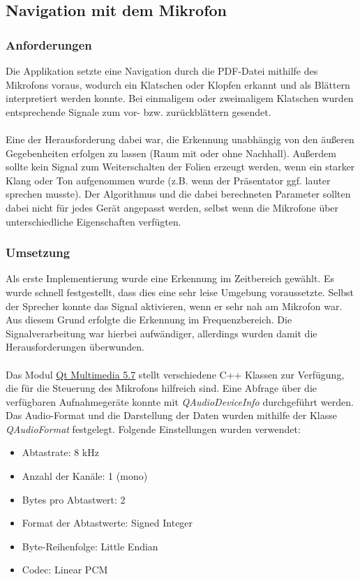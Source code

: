\subsection{Navigation mit dem Mikrofon}
\thispagestyle{fancy}

\subsubsection{Anforderungen}
Die Applikation setzte eine Navigation durch die PDF-Datei mithilfe des Mikrofons voraus, wodurch ein Klatschen oder Klopfen erkannt und als Blättern interpretiert werden konnte. Bei einmaligem oder zweimaligem Klatschen wurden entsprechende Signale zum vor- bzw. zurückblättern gesendet. \\
\\
Eine der Herausforderung dabei war, die Erkennung unabhängig von den äußeren Gegebenheiten erfolgen zu lassen (Raum mit oder ohne Nachhall). Außerdem sollte kein Signal zum Weiterschalten der Folien erzeugt werden, wenn ein starker Klang oder Ton aufgenommen wurde (z.B. wenn der Präsentator ggf. lauter sprechen musste). Der Algorithmus und die dabei berechneten Parameter sollten dabei nicht für jedes Gerät angepasst werden, selbst wenn die Mikrofone über unterschiedliche Eigenschaften verfügten. 

\subsubsection{Umsetzung}
Als erste Implementierung wurde eine Erkennung im Zeitbereich gewählt. Es wurde schnell festgestellt, dass dies eine sehr leise Umgebung voraussetzte. Selbst der Sprecher konnte das Signal aktivieren, wenn er sehr nah am Mikrofon war. Aus diesem Grund erfolgte die Erkennung im Frequenzbereich. Die Signalverarbeitung war hierbei aufwändiger, allerdings wurden damit die Herausforderungen überwunden.\\
\\
Das Modul  \href{http://doc.qt.io/qt-5/qtmultimedia-index.html}{Qt Multimedia 5.7} stellt verschiedene C++ Klassen zur Verfügung, die für die Steuerung des Mikrofons hilfreich sind. Eine Abfrage über die verfügbaren Aufnahmegeräte konnte mit \textit{QAudioDeviceInfo} durchgeführt werden. Das Audio-Format und die Darstellung der Daten wurden mithilfe der Klasse \textit{QAudioFormat} festgelegt. Folgende Einstellungen wurden verwendet:

\begin{center}
	\begin{itemize}
		\item Abtastrate: 8 kHz
		\item Anzahl der Kanäle: 1 (mono)
		\item Bytes pro Abtastwert: 2
		\item Format der Abtastwerte: Signed Integer
		\item Byte-Reihenfolge: Little Endian
		\item Codec: Linear PCM	
	\end{itemize}
\end{center}

